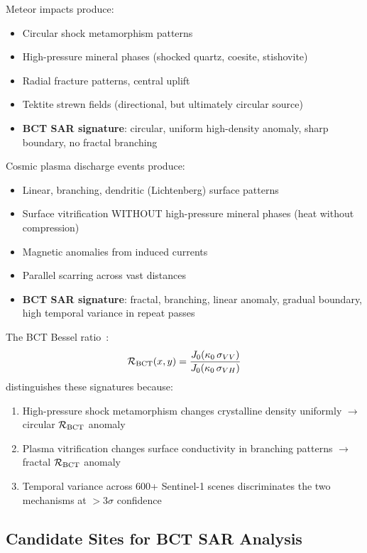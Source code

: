\documentclass[twocolumn,10pt]{article}
\begin{document}
Meteor impacts produce:
\begin{itemize}
\item Circular shock metamorphism patterns
\item High-pressure mineral phases (shocked quartz, coesite, stishovite)
\item Radial fracture patterns, central uplift
\item Tektite strewn fields (directional, but ultimately circular source)
\item \textbf{BCT SAR signature}: circular, uniform high-density anomaly,
  sharp boundary, no fractal branching
\end{itemize}

Cosmic plasma discharge events produce:
\begin{itemize}
\item Linear, branching, dendritic (Lichtenberg) surface patterns
\item Surface vitrification WITHOUT high-pressure mineral phases
  (heat without compression)
\item Magnetic anomalies from induced currents
\item Parallel scarring across vast distances
\item \textbf{BCT SAR signature}: fractal, branching, linear anomaly,
  gradual boundary, high temporal variance in repeat passes
\end{itemize}

The BCT Bessel ratio~\cite{bct_l102}:
%
\begin{equation}
\mathcal{R}_{\rm BCT}(x,y) = \frac{J_0(\kappa_0\,\sigma_{VV})}{J_0(\kappa_0\,\sigma_{VH})}
\end{equation}
%
distinguishes these signatures because:
\begin{enumerate}
\item High-pressure shock metamorphism changes crystalline density
  uniformly $\to$ circular $\mathcal{R}_{\rm BCT}$ anomaly
\item Plasma vitrification changes surface conductivity in branching
  patterns $\to$ fractal $\mathcal{R}_{\rm BCT}$ anomaly
\item Temporal variance across 600+ Sentinel-1 scenes discriminates
  the two mechanisms at $> 3\sigma$ confidence
\end{enumerate}

\subsection{Candidate Sites for BCT SAR Analysis}
\end{document}
